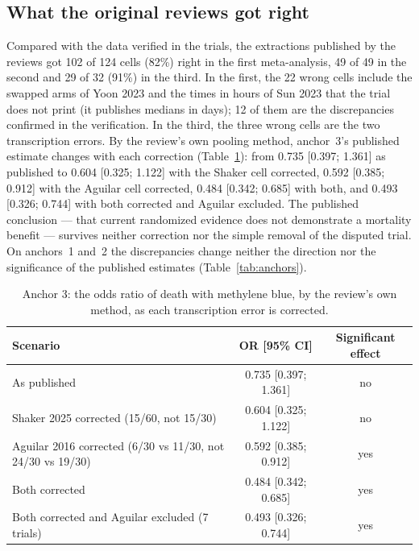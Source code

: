 \documentclass[11pt]{article}
\begin{document}
\subsection{What the original reviews got right}
Compared with the data verified in the trials, the extractions published by the reviews got 102 of 124 cells (82\%) right in the first meta-analysis, 49 of 49 in the second and 29 of 32 (91\%) in the third. In the first, the 22 wrong cells include the swapped arms of Yoon 2023 and the times in hours of Sun 2023 that the trial does not print (it publishes medians in days); 12 of them are the discrepancies confirmed in the verification. In the third, the three wrong cells are the two transcription errors. By the review's own pooling method, anchor~3's published estimate changes with each correction (Table~\ref{tab:scen}): from 0.735 [0.397; 1.361] as published to 0.604 [0.325; 1.122] with the Shaker cell corrected, 0.592 [0.385; 0.912] with the Aguilar cell corrected, 0.484 [0.342; 0.685] with both, and 0.493 [0.326; 0.744] with both corrected and Aguilar excluded. The published conclusion --- that current randomized evidence does not demonstrate a mortality benefit --- survives neither correction nor the simple removal of the disputed trial. On anchors~1 and~2 the discrepancies change neither the direction nor the significance of the published estimates (Table~\ref{tab:anchors}).

\begin{table}[!htbp]
\centering\footnotesize
\caption{Anchor 3: the odds ratio of death with methylene blue, by the review's own method, as each transcription error is corrected.}
\label{tab:scen}
\setlength{\tabcolsep}{4pt}
\begin{tabular}{lcc}
\toprule
Scenario & OR [95\% CI] & Significant effect \\
\midrule
As published & 0.735 [0.397; 1.361] & no \\
Shaker 2025 corrected (15/60, not 15/30) & 0.604 [0.325; 1.122] & no \\
Aguilar 2016 corrected (6/30 vs 11/30, not 24/30 vs 19/30) & 0.592 [0.385; 0.912] & yes \\
Both corrected & 0.484 [0.342; 0.685] & yes \\
Both corrected and Aguilar excluded (7 trials) & 0.493 [0.326; 0.744] & yes \\
\bottomrule
\end{tabular}
\end{table}
\end{document}
